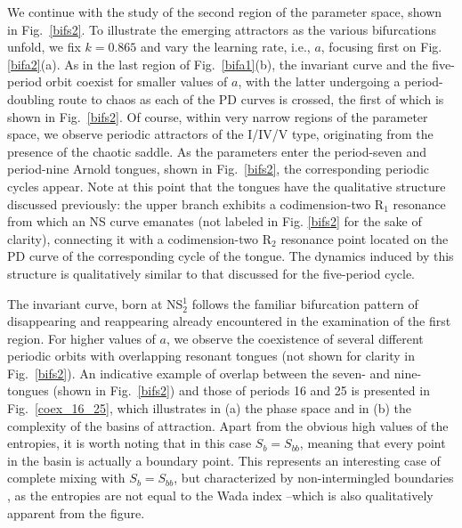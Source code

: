 \documentclass{article}
\theoremstyle{plain}
\theoremstyle{definition}
\begin{document}
We continue with the study of the second region of the parameter space, shown in Fig.~\ref{bifs2}. To illustrate the emerging attractors as the various bifurcations unfold, we fix $k=0.865$ and vary the learning rate, i.e., $a$, focusing first on Fig. \ref{bifa2}(a). As in the last region of Fig.~\ref{bifa1}(b), the invariant curve and the five-period orbit coexist for smaller values of $a$, with the latter undergoing a period-doubling route to chaos as each of the PD curves is crossed, the first of which is shown in Fig.~\ref{bifs2}. Of course, within very narrow regions of the parameter space, we observe periodic attractors of the I/IV/V type, originating from the presence of the chaotic saddle. As the parameters enter the period-seven and period-nine Arnold tongues, shown in Fig.~\ref{bifs2}, the corresponding periodic cycles appear. Note at this point that the tongues have the qualitative structure discussed previously: the upper branch exhibits a codimension-two R$_1$ resonance from which an NS curve emanates (not labeled in Fig. \ref{bifs2} for the sake of clarity), connecting it with a codimension-two R$_2$ resonance point located on the PD curve of the corresponding cycle of the tongue. The dynamics induced by this structure is qualitatively similar to that discussed for the five-period cycle.


The invariant curve, born at NS$_2^1$ follows the familiar bifurcation pattern of disappearing and reappearing already encountered in the examination of the first region. For higher values of $a$, we observe the coexistence of several different periodic orbits with overlapping resonant tongues (not shown for clarity in Fig.~\ref{bifs2}). An indicative example of overlap between the seven- and nine-tongues (shown in Fig.~\ref{bifs2}) and those of periods 16 and 25 is presented in Fig.~\ref{coex_16_25}, which illustrates in (a) the phase space and in (b) the complexity of the basins of attraction. Apart from the obvious high values of the entropies, it is worth noting that in this case $S_b = S_{bb}$, meaning that every point in the basin is actually a boundary point. This represents an interesting case of complete mixing with $S_b = S_{bb}$, but characterized by non-intermingled boundaries \cite{entropy3}, as the entropies are not equal to the Wada index \cite{entropy3}--which is also qualitatively apparent from the figure. 
\end{document}
